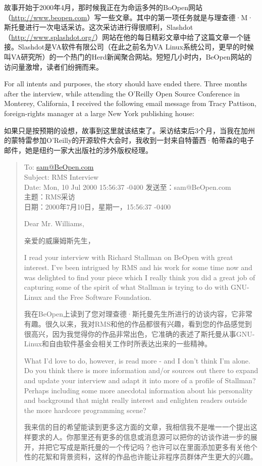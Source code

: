 \ifdefined\chs
故事开始于2000年4月，那时候我正在为命运多舛的BoOpen网站（\url{http://www.beopen.com}）写一些文章。其中的第一项任务就是与理查德·M·斯托曼进行一次电话采访。这次采访进行得很顺利，Slashdot（\url{http://www.splashdot.org/}）网站在他的每日精彩文章中给了这篇文章一个链接。Slashdot是VA软件有限公司（在此之前名为VA Linux系统公司，更早的时候叫VA研究所）的一个热门的Herd新闻聚合网站。短短几小时内，BeOpen网站的访问量激增，读者们纷拥而来。
\fi

\ifdefined\eng
For all intents and purposes, the story should have ended there. Three months after the interview, while attending the O'Reilly Open Source Conference in Monterey, California, I received the following email message from Tracy Pattison, foreign-rights manager at a large New York publishing house:
\fi

\ifdefined\chs
如果只是按预期的设想，故事到这里就该结束了。采访结束后3个月，当我在加州的蒙特雷参加O'Reilly的开源软件大会时，我收到一封来自特蕾西·帕蒂森的电子邮件，她是纽约一家大出版社的涉外版权经理。
\fi

\begin{quote}
\ifdefined\eng
To: \url{sam@BeOpen.com}\\Subject: RMS Interview\\Date: Mon, 10 Jul 2000 15:56:37 -0400
\fi
\ifdefined\chs
发送至：sam@BeOpen.com\\主题：RMS采访\\日期：2000年7月10日，星期一，15:56:37 -0400
\fi

\ifdefined\eng
Dear Mr. Williams,
\fi

\ifdefined\chs
亲爱的威廉姆斯先生，
\fi

\ifdefined\eng
I read your interview with Richard Stallman on BeOpen with great interest. I've been intrigued by RMS and his work for some time now and was delighted to find your piece which I really think you did a great job of capturing some of the spirit of what Stallman is trying to do with GNU-Linux and the Free Software Foundation.
\fi

\ifdefined\chs
我在BeOpen上读到了您对理查德·斯托曼先生所进行的访谈内容，它非常有趣。很久以来，我对RMS和他的作品都很有兴趣，看到您的作品感觉到很高兴，因为我觉得你的作品非常出色，它准确的表述了斯托曼从事GNU-Linux和自由软件基金会相关工作时所表达出来的一些精神。
\fi

\ifdefined\eng
What I'd love to do, however, is read more - and I don't think I'm alone. Do you think there is more information and/or sources out there to expand and update your interview and adapt it into more of a profile of Stallman? Perhaps including some more anecdotal information about his personality and background that might really interest and enlighten readers outside the more hardcore programming scene?
\fi

\ifdefined\chs
我来信的目的希望能读到更多这方面的文章，我相信我不是唯一一个提出这样要求的人。你那里还有更多的信息或消息源可以把你的访谈作进一步的展开，并把它写成是斯托曼的一个传记吗？也许可以在里面添加更多有关他个性的花絮和背景资料，这样的作品也许能让非程序员群体产生更大的兴趣。
\fi
\end{quote}


